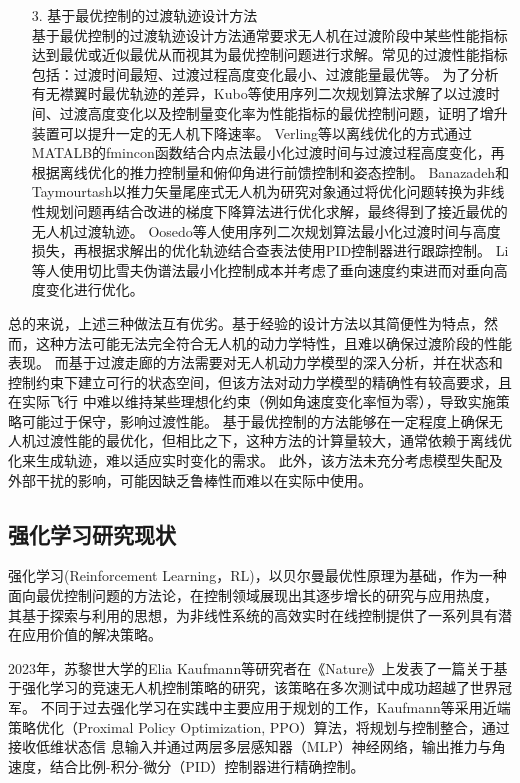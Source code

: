 \begin{itemize}
    \item [3.]基于最优控制的过渡轨迹设计方法\\

    基于最优控制的过渡轨迹设计方法通常要求无人机在过渡阶段中某些性能指标达到最优或近似最优从而视其为最优控制问题进行求解。常见的过渡性能指标包括：过渡时间最短、过渡过程高度变化最小、过渡能量最优等。
    为了分析有无襟翼时最优轨迹的差异，Kubo等使用序列二次规划算法求解了以过渡时间、过渡高度变化以及控制量变化率为性能指标的最优控制问题，证明了增升装置可以提升一定的无人机下降速率\cite{kubo2008tail}。
    Verling等以离线优化的方式通过MATALB的fmincon函数结合内点法最小化过渡时间与过渡过程高度变化，再根据离线优化的推力控制量和俯仰角进行前馈控制和姿态控制\cite{verling2017model}。
    Banazadeh和Taymourtash以推力矢量尾座式无人机为研究对象通过将优化问题转换为非线性规划问题再结合改进的梯度下降算法进行优化求解，最终得到了接近最优的无人机过渡轨迹\cite{banazadeh2016optimal}。
    Oosedo等人使用序列二次规划算法最小化过渡时间与高度损失，再根据求解出的优化轨迹结合查表法使用PID控制器进行跟踪控制\cite{oosedo2017optimal}。
    Li等人使用切比雪夫伪谱法最小化控制成本并考虑了垂向速度约束进而对垂向高度变化进行优化\cite{li2020transition}。

\end{itemize}

总的来说，上述三种做法互有优劣。基于经验的设计方法以其简便性为特点，然而，这种方法可能无法完全符合无人机的动力学特性，且难以确保过渡阶段的性能表现。
而基于过渡走廊的方法需要对无人机动力学模型的深入分析，并在状态和控制约束下建立可行的状态空间，但该方法对动力学模型的精确性有较高要求，且在实际飞行
中难以维持某些理想化约束（例如角速度变化率恒为零），导致实施策略可能过于保守，影响过渡性能。
基于最优控制的方法能够在一定程度上确保无人机过渡性能的最优化，但相比之下，这种方法的计算量较大，通常依赖于离线优化来生成轨迹，难以适应实时变化的需求。
此外，该方法未充分考虑模型失配及外部干扰的影响，可能因缺乏鲁棒性而难以在实际中使用。

\subsection{强化学习研究现状}
强化学习(Reinforcement Learning，RL)，以贝尔曼最优性原理为基础，作为一种面向最优控制问题的方法论，在控制领域展现出其逐步增长的研究与应用热度，
其基于探索与利用的思想，为非线性系统的高效实时在线控制提供了一系列具有潜在应用价值的解决策略。

2023年，苏黎世大学的Elia Kaufmann等研究者在《Nature》上发表了一篇关于基于强化学习的竞速无人机控制策略的研究，该策略在多次测试中成功超越了世界冠军。
不同于过去强化学习在实践中主要应用于规划的工作，Kaufmann等采用近端策略优化（Proximal Policy Optimization, PPO）算法，将规划与控制整合，通过接收低维状态信
息输入并通过两层多层感知器（MLP）神经网络，输出推力与角速度，结合比例-积分-微分（PID）控制器进行精确控制\cite{kaufmann2023champion}。

